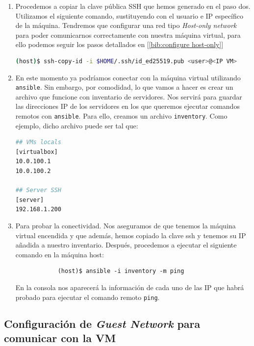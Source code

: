 \documentclass[12pt]{article}
\begin{document}
\begin{enumerate}
		\item Procedemos a copiar la clave pública SSH que hemos generado en el paso dos. Utilizamos el siguiente comando, sustituyendo con el usuario e IP específico de la máquina. Tendremos que configurar una red tipo \textit{Host-only network} para poder comunicarnos correctamente con nuestra máquina virtual, para ello podemos seguir los pasos detallados en [\ref{bib:configure host-only}]
		\begin{lstlisting}[language=Bash, caption={Copiar clave pública de \texttt{ansible} a VM}]
(host)$ ssh-copy-id -i $HOME/.ssh/id_ed25519.pub <user>@<IP VM>
		\end{lstlisting}
		
		\item En este momento ya podríamos conectar con la máquina virtual utilizando \texttt{ansible}. Sin embargo, por comodidad, lo que vamos a hacer es crear un archivo que funcione con inventario de servidores. Nos servirá para guardar las direcciones IP de los servidores en los que queremos ejecutar comandos remotos con \texttt{ansible}. Para ello, creamos un archivo \texttt{inventory}. Como ejemplo, dicho archivo puede ser tal que:
		\begin{lstlisting}[language=Bash, caption={Contenido del archivo \texttt{inventory} de \texttt{ansible}}]
## VMs locals 
[virtualbox]
10.0.100.1
10.0.100.2
		
## Server SSH
[server]
192.168.1.200
		\end{lstlisting}
		
		\item Para probar la conectividad. Nos aseguramos de que tenemos la máquina virtual encendida y que además, hemos copiado la clave ssh y tenemos su IP añadida a nuestro inventario. Después, procedemos a ejecutar el siguiente comando en la máquina host:
		\begin{verbatim}
			(host)$ ansible -i inventory -m ping
		\end{verbatim}
		\noindent En la consola nos aparecerá la información de cada uno de las IP que habrá probado para ejecutar el comando remoto \texttt{ping}.
	\end{enumerate}
	
	\pagebreak
	
	\subsection{Configuración de \textit{Guest Network} para comunicar con la VM}
	
\end{document}
